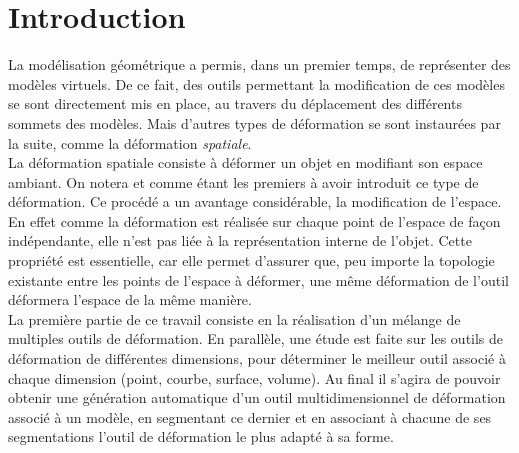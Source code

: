 \chapter{Introduction}

\graphicspath{ {Introduction/IntroductionFigs/PNG/}
  {Introduction/IntroductionFigs/PDF/}
  {Introduction/IntroductionFigs/} }

La modélisation géométrique a permis, dans un premier temps, de
représenter des modèles virtuels. De ce fait, des outils permettant la
modification de ces modèles se sont directement mis en place, au
travers du déplacement des différents sommets des modèles. Mais
d'autres types de déformation se sont instaurées par la suite, comme
la déformation \textit{spatiale}.
\\

La déformation spatiale consiste à déformer un objet en modifiant son
espace ambiant.  On notera \cite{Bar84} et \cite{SP86} comme étant les
premiers à avoir introduit ce type de déformation. Ce procédé a un
avantage considérable, la modification de l'espace. En effet comme la
déformation est réalisée sur chaque point de l'espace de façon
indépendante, elle n'est pas liée à la représentation interne de
l'objet. Cette propriété est essentielle, car elle permet d'assurer
que, peu importe la topologie existante entre les points de l'espace à
déformer, une même déformation de l'outil déformera l'espace de la
même manière.
\\

La première partie de ce travail consiste en la réalisation d'un
mélange de multiples outils de déformation. En parallèle, une étude
est faite sur les outils de déformation de différentes dimensions,
pour déterminer le meilleur outil associé à chaque dimension (point,
courbe, surface, volume). Au final il s'agira de pouvoir obtenir une
génération automatique d'un outil multidimensionnel de déformation
associé à un modèle, en segmentant ce dernier et en associant à
chacune de ses segmentations l'outil de déformation le plus adapté à
sa forme.
\\

